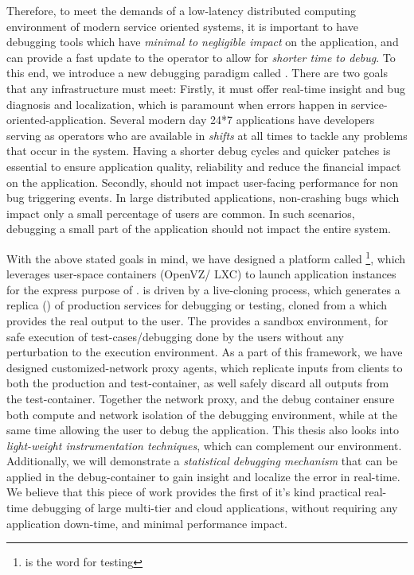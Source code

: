 Therefore, to meet the demands of a low-latency distributed computing environment of modern service oriented systems, it is important to have debugging tools which have \textit{minimal to negligible impact} on the application, and can provide a fast update to the operator to allow for \textit{shorter time to debug}.
To this end, we introduce a new debugging paradigm called \livedebugging.
There are two goals that any \livedebugging infrastructure must meet:
Firstly, it must offer real-time insight and bug diagnosis and localization, which is paramount when errors happen in service-oriented-application. 
Several modern day 24*7 applications have developers serving as operators who are available in \textit{shifts} at all times to tackle any problems that occur in the system.
Having a shorter debug cycles and quicker patches is essential to ensure application quality, reliability and reduce the financial impact on the application.
Secondly, \livedebugging should not impact user-facing performance for non bug triggering events.
In large distributed applications, non-crashing bugs which impact only a small percentage of users are common. 
In such scenarios, debugging a small part of the application should not impact the entire system.

With the above stated goals in mind, we have designed a platform called \parikshan\footnote{\parikshan is the \toolNameLang word for  testing}, which leverages user-space containers (OpenVZ/ LXC) to launch application instances for the express purpose of \livedebugging. 
\parikshan is driven by a  live-cloning process, which generates a replica (\debugcontainer) of production services for debugging or testing, cloned from a \productioncontainer which provides the real output to the user.
The \debugcontainer provides a sandbox environment, for safe execution of test-cases/debugging done by the users without any perturbation to the execution environment.
As a part of this framework, we have designed customized-network proxy agents, which replicate inputs from clients to both the production and test-container, as well safely discard all outputs from the test-container.
Together the network proxy, and the debug container ensure both compute and network isolation of the debugging environment, while at the same time allowing the user to debug the application.
This thesis also looks into \textit{light-weight instrumentation techniques}, which can complement our \livedebugging environment.
Additionally, we will demonstrate a \textit{statistical debugging mechanism} that can be applied in the debug-container to gain insight and localize the error in real-time. 
We believe that this piece of work provides the first of it's kind practical real-time debugging of large multi-tier and cloud applications, without requiring any application down-time, and minimal performance impact.

